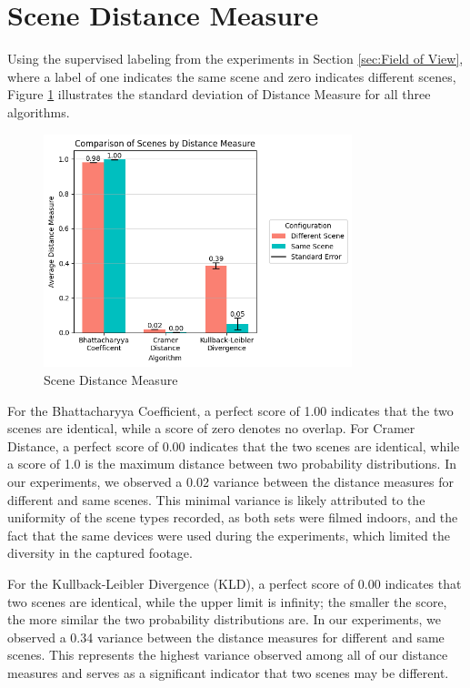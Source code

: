 \section{Scene Distance Measure}
\label{sec:Scene Distance Measure}
Using the supervised labeling from the experiments in Section \ref{sec:Field of View}, where a label of one indicates the same scene and zero indicates different scenes, Figure \ref{fig:scene-distance-measure} illustrates the standard deviation of Distance Measure for all three algorithms. 

\begin{figure}[ht]
    \centering
    \includegraphics[width=0.8\textwidth]{5 Results/Figures/5.4 Bar Chart.png}
    \caption{Scene Distance Measure}
    \label{fig:scene-distance-measure}
\end{figure}

For the Bhattacharyya Coefficient, a perfect score of 1.00 indicates that the two scenes are identical, while a score of zero denotes no overlap. For Cramer Distance, a perfect score of 0.00 indicates that the two scenes are identical, while a score of 1.0 is the maximum distance between two probability distributions. In our experiments, we observed a 0.02 variance between the distance measures for different and same scenes. This minimal variance is likely attributed to the uniformity of the scene types recorded, as both sets were filmed indoors, and the fact that the same devices were used during the experiments, which limited the diversity in the captured footage.

For the Kullback-Leibler Divergence (KLD), a perfect score of 0.00 indicates that two scenes are identical, while the upper limit is infinity; the smaller the score, the more similar the two probability distributions are. In our experiments, we observed a 0.34 variance between the distance measures for different and same scenes. This represents the highest variance observed among all of our distance measures and serves as a significant indicator that two scenes may be different.


